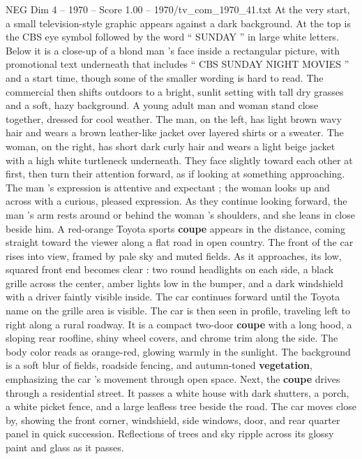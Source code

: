 \begin{textsample}{NEG Dim 4 – 1970 – Score 1.00 – 1970/tv\_com\_1970\_41.txt}  \label{ex:f4_neg_007}
At the very start, a small television-style graphic appears against a dark background.
At the top is the CBS eye symbol followed by the word “ SUNDAY ” in large white letters.
Below it is a close-up of a blond man ’s face inside a rectangular picture, with promotional text underneath that includes “ CBS SUNDAY NIGHT MOVIES ” and a start time, though some of the smaller wording is hard to read.
The commercial then shifts outdoors to a bright, sunlit setting with tall dry grasses and a soft, hazy background.
A young adult man and woman stand close together, dressed for cool weather.
The man, on the left, has light brown wavy hair and wears a brown leather-like jacket over layered shirts or a sweater.
The woman, on the right, has short dark curly hair and wears a light beige jacket with a high white turtleneck underneath.
They face slightly toward each other at first, then turn their attention forward, as if looking at something approaching.
The man ’s expression is attentive and expectant ; the woman looks up and across with a curious, pleased expression.
As they continue looking forward, the man ’s arm rests around or behind the woman ’s shoulders, and she leans in close beside him.
A red-orange Toyota sports \textbf{coupe} appears in the distance, coming straight toward the viewer along a flat road in open country.
The front of the car rises into view, framed by pale sky and muted fields.
As it approaches, its low, squared front end becomes clear : two round headlights on each side, a black grille across the center, amber lights low in the bumper, and a dark windshield with a driver faintly visible inside.
The car continues forward until the Toyota name on the grille area is visible.
The car is then seen in profile, traveling left to right along a rural roadway.
It is a compact two-door \textbf{coupe} with a long hood, a sloping rear roofline, shiny wheel covers, and chrome trim along the side.
The body color reads as orange-red, glowing warmly in the sunlight.
The background is a soft blur of fields, roadside fencing, and autumn-toned \textbf{vegetation}, emphasizing the car ’s movement through open space.
Next, the \textbf{coupe} drives through a residential street.
It passes a white house with dark shutters, a porch, a white picket fence, and a large leafless tree beside the road.
The car moves close by, showing the front corner, windshield, side windows, door, and rear quarter panel in quick succession.
Reflections of trees and sky ripple across its glossy paint and glass as it passes.

\end{textsample}
